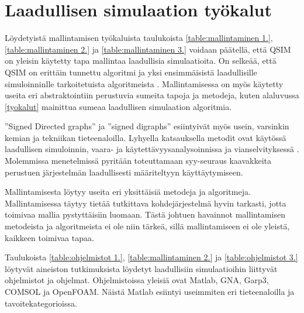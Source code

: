 \documentclass[utf8]{gradu3}
\begin{document}
\section{Laadullisen simulaation työkalut}

Löydetyistä mallintamisen työkaluista taulukoista \ref{table:mallintaminen 1.},
\ref{table:mallintaminen 2.} ja \ref{table:mallintaminen 3.} voidaan päätellä, 
että QSIM on yleisin käytetty tapa mallintaa laadullisia simulaatioita.
On selkeää, että QSIM on erittäin tunnettu algoritmi ja yksi ensimmäisistä
laadullisille simuloinninlle tarkoitetuista algoritmeista
\parencite{kuipers1986qualitative}.
Mallintamisessa on myös käytetty useita eri abstraktointiin perustuvia sumeita tapoja ja metodeja, kuten alaluvussa \ref{tyokalut} mainittua sumeaa laadullisen simulaation algoritmia.

''Signed Directed graphs'' ja ''signed digraphs'' esiintyivät myös usein, 
varsinkin kemian ja tekniikan tieteenaloilla. Lyhyella katsauksella
metodit ovat käytössä laadullisen simuloinnin, vaara- ja käytettävyysanalysoinnissa 
ja vianselvityksessä \parencite{SDGapplication2004}.
Molemmissa menetelmissä pyritään toteuttamaan syy-seuraus kaavakkeita perustuen
järjestelmän laadullisesti määriteltyyn käyttäytymiseen.

Mallintamisesta löytyy useita eri yksittäisiä metodeja ja algoritmeja. 
Mallintamisessa täytyy tietää tutkittava kohdejärjestelmä hyvin tarkasti, 
jotta toimivaa mallia pystyttäisiin luomaan. Tästä johtuen havainnot 
mallintamisen metodeista ja algoritmeista ei ole niin tärkeä, sillä
mallintamiseen ei ole yleistä, kaikkeen toimivaa tapaa.

Taulukoista \ref{table:ohjelmistot 1.}, \ref{table:mallintaminen 2.} ja 
\ref{table:ohjelmistot 3.} löytyvät aineiston tutkimuksista löydetyt 
laadullisiin simulaatioihin liittyvät ohjelmistot ja ohjelmat.
Ohjelmistoissa yleisiä ovat Matlab, GNA, Garp3, COMSOL ja OpenFOAM. 
Näistä Matlab esiintyi useimmiten eri tieteenaloilla ja tavoitekategorioissa.
\end{document}
